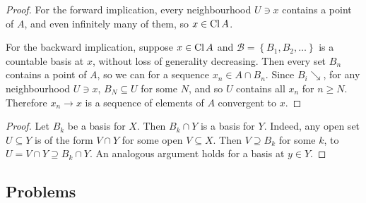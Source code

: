 \begin{proof}
    For the forward implication, every neighbourhood \( U \ni x \) contains a point of \( A \), and even infinitely many of them, so \( x \in \operatorname{Cl} A \).

    For the backward implication, suppose \( x \in \operatorname{Cl} A \) and \( \mathcal{B} = \left\{ B_1, B_2, \ldots \right\} \) is a countable basis at \( x \), without loss of generality decreasing. Then every set \( B_n \) contains a point of \( A \), so we can for a sequence \( x_n \in A \cap B_n \). Since \( B_i \searrow \), for any neighbourhood \( U \ni x \), \( B_N \subseteq U \) for some \( N \), and so \( U \) contains all \( x_n \) for \( n \geqslant N \). Therefore \( x_n \to x \) is a sequence of elements of \( A \) convergent to \( x \).
\end{proof}


\begin{proof}
    Let \( B_k \) be a basis for \( X \). Then \( B_k \cap Y \) is a basis for \( Y \). Indeed, any open set \( U \subseteq Y \) is of the form \( V \cap Y \) for some open \( V \subseteq X \). Then \( V \supseteq B_k \) for some \( k \), to \( U = V \cap Y \supseteq B_k \cap Y \). An analogous argument holds for a basis at \( y \in Y \).
\end{proof}

\subsection{Problems}


